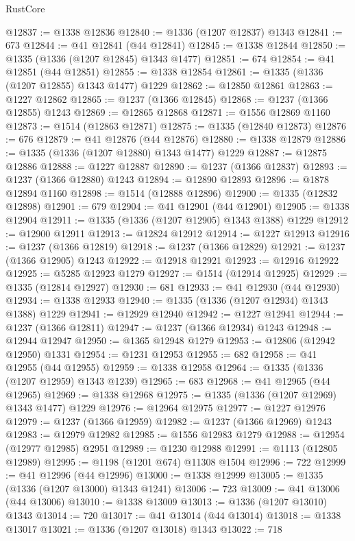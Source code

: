 \begin{lexlean}{RustCore}
\begin{coremodule}
@12837 := @1338 @12836
@12840 := @1336 (@1207 @12837) @1343
@12841 := 673
@12844 := @41 @12841 (@44 @12841)
@12845 := @1338 @12844
@12850 := @1335 (@1336 (@1207 @12845) @1343 @1477)
@12851 := 674
@12854 := @41 @12851 (@44 @12851)
@12855 := @1338 @12854
@12861 := @1335 (@1336 (@1207 @12855) @1343 @1477) @1229
@12862 := @12850 @12861
@12863 := @1227 @12862
@12865 := @1237 (@1366 @12845)
@12868 := @1237 (@1366 @12855) @1243
@12869 := @12865 @12868
@12871 := @1556 @12869 @1160
@12873 := @1514 (@12863 @12871)
@12875 := @1335 (@12840 @12873)
@12876 := 676
@12879 := @41 @12876 (@44 @12876)
@12880 := @1338 @12879
@12886 := @1335 (@1336 (@1207 @12880) @1343 @1477) @1229
@12887 := @12875 @12886
@12888 := @1227 @12887
@12890 := @1237 (@1366 @12837)
@12893 := @1237 (@1366 @12880) @1243
@12894 := @12890 @12893
@12896 := @1878 @12894 @1160
@12898 := @1514 (@12888 @12896)
@12900 := @1335 (@12832 @12898)
@12901 := 679
@12904 := @41 @12901 (@44 @12901)
@12905 := @1338 @12904
@12911 := @1335 (@1336 (@1207 @12905) @1343 @1388) @1229
@12912 := @12900 @12911
@12913 := @12824 @12912
@12914 := @1227 @12913
@12916 := @1237 (@1366 @12819)
@12918 := @1237 (@1366 @12829)
@12921 := @1237 (@1366 @12905) @1243
@12922 := @12918 @12921
@12923 := @12916 @12922
@12925 := @5285 @12923 @1279
@12927 := @1514 (@12914 @12925)
@12929 := @1335 (@12814 @12927)
@12930 := 681
@12933 := @41 @12930 (@44 @12930)
@12934 := @1338 @12933
@12940 := @1335 (@1336 (@1207 @12934) @1343 @1388) @1229
@12941 := @12929 @12940
@12942 := @1227 @12941
@12944 := @1237 (@1366 @12811)
@12947 := @1237 (@1366 @12934) @1243
@12948 := @12944 @12947
@12950 := @1365 @12948 @1279
@12953 := @12806 (@12942 @12950) @1331
@12954 := @1231 @12953
@12955 := 682
@12958 := @41 @12955 (@44 @12955)
@12959 := @1338 @12958
@12964 := @1335 (@1336 (@1207 @12959) @1343 @1239)
@12965 := 683
@12968 := @41 @12965 (@44 @12965)
@12969 := @1338 @12968
@12975 := @1335 (@1336 (@1207 @12969) @1343 @1477) @1229
@12976 := @12964 @12975
@12977 := @1227 @12976
@12979 := @1237 (@1366 @12959)
@12982 := @1237 (@1366 @12969) @1243
@12983 := @12979 @12982
@12985 := @1556 @12983 @1279
@12988 := @12954 (@12977 @12985) @2951
@12989 := @1230 @12988
@12991 := @1113 (@12805 @12989)
@12995 := @1198 (@1201 @674) @11308 @1504
@12996 := 722
@12999 := @41 @12996 (@44 @12996)
@13000 := @1338 @12999
@13005 := @1335 (@1336 (@1207 @13000) @1343 @1241)
@13006 := 723
@13009 := @41 @13006 (@44 @13006)
@13010 := @1338 @13009
@13013 := @1336 (@1207 @13010) @1343
@13014 := 720
@13017 := @41 @13014 (@44 @13014)
@13018 := @1338 @13017
@13021 := @1336 (@1207 @13018) @1343
@13022 := 718

\end{coremodule}
\end{lexlean}
